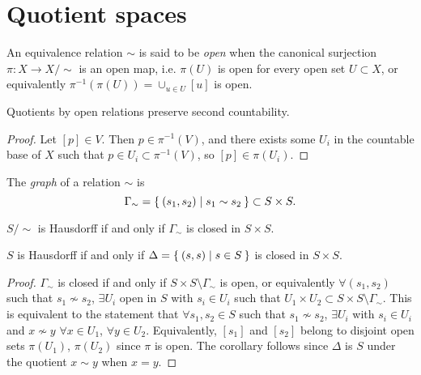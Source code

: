 \section{Quotient spaces}

\begin{defn}
An equivalence relation $\sim$ is said to be \emph{open} when the
canonical surjection $\pi: X \to X / \sim$ is an open map, i.e.
$\pi(U)$ is open for every open set $U \subset X$, or equivalently
$\pi^{-1}(\pi(U)) = \cup_{u \in U} [u]$ is open.
\end{defn}

\begin{prop}
  Quotients by open relations preserve second countability.
\end{prop}

\begin{proof}
Let $[p] \in V$. Then $p \in \pi^{-1}(V)$, and there exists some
$U_i$ in the countable base of
$X$ such that $p \in U_i \subset \pi^{-1}(V)$, so $[p] \in \pi(U_i)$.
\end{proof}

\begin{defn}
The \emph{graph} of a relation $\sim$ is
$$
  \Gamma_\sim
= \Set{ (s_1, s_2) | s_1 \sim s_2 }
\subset S \times S.
$$
\end{defn}

\begin{prop}
$S / \sim$ is Hausdorff if and only if $\Gamma_\sim$ is closed in
$S \times S$.
\end{prop}
\begin{corol}
$S$ is Hausdorff if and only if
$\Delta = \Set{(s, s) | s \in S}$ is closed in $S \times S$.
\end{corol}

\begin{proof}
$\Gamma_\sim$ is closed if and only if
$S \times S \setminus \Gamma_\sim$ is open, or equivalently
$\forall (s_1, s_2)$ such that $s_1 \nsim s_2$, $\exists U_i$ open in
$S$ with $s_i \in U_i$ such that
$U_1 \times U_2 \subset S \times S \setminus \Gamma_\sim$. This is
equivalent to the statement that $\forall s_1, s_2 \in S$ such that
$s_1 \nsim s_2$, $\exists U_i$ with $s_i \in U_i$ and
$x \nsim y$ $\forall x \in U_1$, $\forall y \in U_2$. Equivalently,
$[s_1]$ and $[s_2]$ belong to disjoint open sets $\pi(U_1)$,
$\pi(U_2)$ since $\pi$ is open. The corollary follows since
$\Delta$ is $S$ under the quotient $x \sim y$ when $x = y$.
\end{proof}


